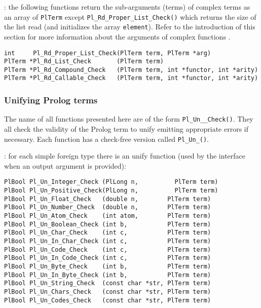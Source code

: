 : the following functions return the sub-arguments
(terms) of complex terms as an array of \texttt{PlTerm} except
\texttt{Pl\_Rd\_Proper\_List\_Check()} which returns the size of the list read
(and initializes the array \texttt{element}). Refer to the introduction of
this section for more information about the arguments of complex functions
.

\begin{Indentation}
\begin{verbatim}
int     Pl_Rd_Proper_List_Check(PlTerm term, PlTerm *arg)
PlTerm *Pl_Rd_List_Check       (PlTerm term)
PlTerm *Pl_Rd_Compound_Check   (PlTerm term, int *functor, int *arity)
PlTerm *Pl_Rd_Callable_Check   (PlTerm term, int *functor, int *arity)
\end{verbatim}
\end{Indentation}

\subsubsection{Unifying Prolog terms}
The name of all functions presented here are of the form
\texttt{Pl\_Un\_\_Check()}. They all check the validity of the
Prolog term to unify emitting appropriate errors if necessary. Each function
has a check-free version called \texttt{Pl\_Un\_()}.

: for each simple foreign type
 there is an unify function (used by the
interface when an output argument is provided):

\begin{Indentation}
\begin{verbatim}
PlBool Pl_Un_Integer_Check (PlLong n,          PlTerm term)
PlBool Pl_Un_Positive_Check(PlLong n,          PlTerm term)
PlBool Pl_Un_Float_Check   (double n,        PlTerm term)
PlBool Pl_Un_Number_Check  (double n,        PlTerm term)
PlBool Pl_Un_Atom_Check    (int atom,        PlTerm term)
PlBool Pl_Un_Boolean_Check (int b,           PlTerm term)
PlBool Pl_Un_Char_Check    (int c,           PlTerm term)
PlBool Pl_Un_In_Char_Check (int c,           PlTerm term)
PlBool Pl_Un_Code_Check    (int c,           PlTerm term)
PlBool Pl_Un_In_Code_Check (int c,           PlTerm term)
PlBool Pl_Un_Byte_Check    (int b,           PlTerm term)
PlBool Pl_Un_In_Byte_Check (int b,           PlTerm term)
PlBool Pl_Un_String_Check  (const char *str, PlTerm term)
PlBool Pl_Un_Chars_Check   (const char *str, PlTerm term)
PlBool Pl_Un_Codes_Check   (const char *str, PlTerm term)
\end{verbatim}
\end{Indentation}

